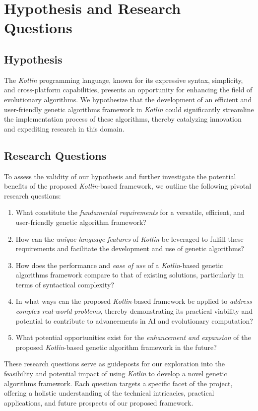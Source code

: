 \section{Hypothesis and Research Questions}
\label{sec:hyphotesis_and_research_questions}
  \subsection{Hypothesis}
    The \textit{Kotlin} programming language, known for its expressive syntax, 
    simplicity, and cross-platform capabilities, presents an opportunity for 
    enhancing the field of evolutionary algorithms.
    We hypothesize that the development of an efficient and user-friendly
    genetic algorithms framework in \textit{Kotlin} could significantly
    streamline the implementation process of these algorithms, thereby
    catalyzing innovation and expediting research in this domain.

  \subsection{Research Questions}
    To assess the validity of our hypothesis and further investigate the
    potential benefits of the proposed \textit{Kotlin}-based framework, we
    outline the following pivotal research questions:

    \begin{enumerate}
      \item What constitute the \textit{fundamental requirements} for a
        versatile, efficient, and user-friendly genetic algorithm framework?
      \item How can the \textit{unique language features} of \textit{Kotlin} be
        leveraged to fulfill these requirements and facilitate the development
        and use of genetic algorithms?
      \item How does the performance and \textit{ease of use} of a
        \textit{Kotlin}-based genetic algorithms framework compare to that of
        existing solutions, particularly in terms of syntactical complexity?
      \item In what ways can the proposed \textit{Kotlin}-based framework be
        applied to \textit{address complex real-world problems}, thereby
        demonstrating its practical viability and potential to contribute to
        advancements in AI and evolutionary computation?
      \item What potential opportunities exist for the \textit{enhancement and
        expansion} of the proposed \textit{Kotlin}-based genetic algorithm
        framework in the future?
    \end{enumerate}
    
    These research questions serve as guideposts for our exploration into the
    feasibility and potential impact of using \textit{Kotlin} to develop a novel
    genetic algorithms framework.
    Each question targets a specific facet of the project, offering a holistic
    understanding of the technical intricacies, practical applications, and
    future prospects of our proposed framework.